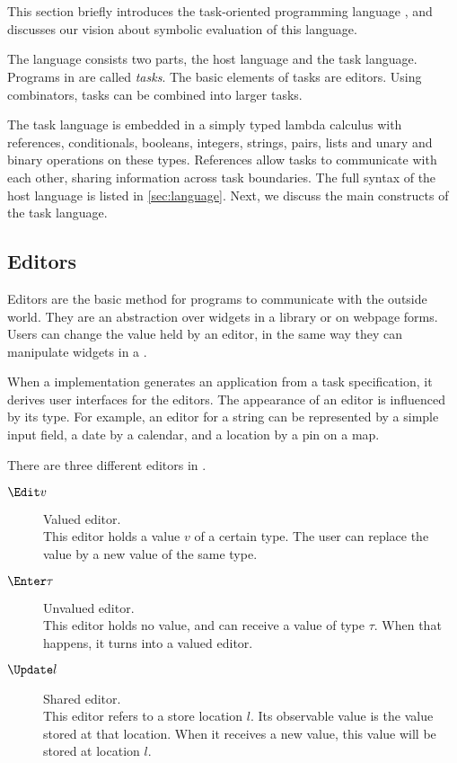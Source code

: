 
\section{\TOPHAT}
\label{sec:intuition}

This section briefly introduces the task-oriented programming language \TOPHAT,
and discusses our vision about symbolic evaluation of this language.

The \TOPHAT language consists two parts, the host language and the task language.
Programs in \TOPHAT are called \emph{tasks}.
The basic elements of tasks are editors.
Using combinators, tasks can be combined into larger tasks.

The task language is embedded in a simply typed lambda calculus with references, conditionals, booleans, integers, strings, pairs, lists and unary and binary operations on these types.
References allow tasks to communicate with each other, sharing information across task boundaries.
The full syntax of the host language is listed in \cref{sec:language}.
Next, we discuss the main constructs of the task language.


\subsection{Editors}

Editors are the basic method for programs to communicate with the outside world.
They are an abstraction over widgets in a \GUI library or on webpage forms.
Users can change the value held by an editor, in the same way they can manipulate widgets in a \GUI.

When a \TOP implementation generates an application from a task specification, it derives user interfaces for the editors.
The appearance of an editor is influenced by its type.
For example, an editor for a string can be represented by a simple input field, a date by a calendar, and a location by a pin on a map.

There are three different editors in \TOPHAT.
\begin{description}
  \item[$\Edit v$] Valued editor.\\
    This editor holds a value $v$ of a certain type.
    The user can replace the value by a new value of the same type.
  \item[$\Enter \tau$] Unvalued editor.\\
    This editor holds no value, and can receive a value of type $\tau$.
    When that happens, it turns into a valued editor.
  \item[$\Update l$] Shared editor.\\
    This editor refers to a store location $l$.
    Its observable value is the value stored at that location.
    When it receives a new value, this value will be stored at location $l$.
\end{description}



